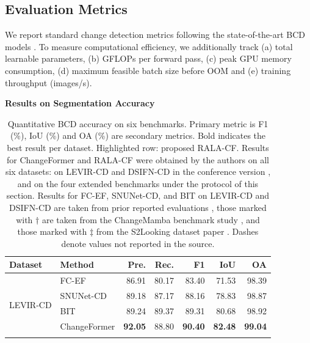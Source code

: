\documentclass[runningheads]{llncs}
\newcommand{\journal}[1]{{\color{orange}#1}}
\begin{document}
\subsection{Evaluation Metrics}

We report standard change detection metrics following the state-of-the-art BCD models \cite{Zheng2020LEVIR,Zhang2020FusionNetDSIFN,Bandara2022ChangeFormer,Chen2022BIT,Fang2021SNUNetCD}. To measure computational efficiency, we
additionally track (a) total learnable parameters, (b) GFLOPs per forward pass,
(c) peak GPU memory consumption, (d) maximum feasible batch size before OOM and
(e) training throughput (images/s).

\noindent \textbf{Results on Segmentation Accuracy}

\begin{table}
\centering
\caption{\journal{Quantitative BCD accuracy on six benchmarks. Primary metric
is F1 (\%), IoU (\%) and OA (\%) are secondary metrics. Bold indicates the
best result per dataset. \colorbox{pastelorange}{Highlighted} row: proposed
RALA-CF. Results for ChangeFormer and RALA-CF were obtained by the authors on
all six datasets: on LEVIR-CD and DSIFN-CD in the conference version
\cite{acuna2026efficient}, and on the four extended benchmarks under the
protocol of this section. Results for FC-EF, SNUNet-CD, and BIT on LEVIR-CD
and DSIFN-CD are taken from prior reported evaluations
\cite{Bandara2022ChangeFormer,Chen2022BIT}, those marked with $\dagger$ are
taken from the ChangeMamba benchmark study \cite{Chen2024ChangeMamba}, and
those marked with $\ddagger$ from the S2Looking dataset paper
\cite{ShenS2Looking2021}. Dashes denote values not reported in the source.}}
\label{tab:master}
\begin{tabularx}{\textwidth}{|l|X|r|r|r|r|r|}
\hline
\textbf{Dataset} & \textbf{Method}
    & \textbf{Pre.} & \textbf{Rec.} & \textbf{F1}
    & \textbf{IoU} & \textbf{OA} \\
\hline
\multirow{5}{*}{LEVIR-CD}
    & FC-EF \cite{Daudt2018SiamICIP}
        & 86.91 & 80.17 & 83.40 & 71.53 & 98.39 \\
    & SNUNet-CD \cite{Fang2021SNUNetCD}
        & 89.18 & 87.17 & 88.16 & 78.83 & 98.87 \\
    & BIT \cite{Chen2022BIT}
        & 89.24 & 89.37 & 89.31 & 80.68 & 98.92 \\
    & ChangeFormer \cite{Bandara2022ChangeFormer}
        & \textbf{92.05} & 88.80 & \textbf{90.40} & \textbf{82.48} & \textbf{99.04} \\
\rowcolor{pastelorange}

\end{tabularx}
\end{table}
\end{document}

